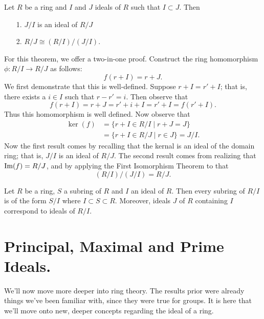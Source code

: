     \begin{thm}
        Let $R$ be a ring and $I$ and $J$ ideals of $R$ such
        that $I \subset J$. Then 
        \begin{itemize}
            \item[1.] $J/I$ is an ideal of $R/J$ 
            \item[2.] $R/J \cong (R/I)/(J/I)$. 
        \end{itemize}
    \end{thm}

    \begin{prf}
        For this theorem, we offer a two-in-one proof. 
        Construct the ring homomorphism $\phi:R/I \to R/J$ as
        follows: 
        \[
            f(r + I) = r + J.
        \]
        We first demonstrate that this is well-defined. Suppose $r
        + I = r' + I$; that is, there exists a $i \in I$ such that
        $r - r' = i$. Then observe that 
        \[
            f(r + I) = r + J = r' + i + I = r' + I = f(r' + I).
        \]
        Thus this homomorphism is well defined. Now observe that 
        \begin{align*}
            \ker(f) &= \{r + I \in R/I \mid r + J = J\}\\ 
            &= \{r + I \in R/J \mid r \in J\} = J/I.
        \end{align*}
        Now the first result comes by recalling that the kernal is
        an ideal of the domain ring; that is, $J/I$ is an ideal of
        $R/J$. The second result comes from realizing that $\mbox{Im}(f)
        = R/J$, and by applying the First Isomorphism Theorem to
        that 
        \[
            (R/I)/(J/I) = R/J.
        \]
    \end{prf}

    \begin{thm}
        Let $R$ be a ring, $S$ a subring of $R$ and $I$ an ideal of $R$. Then every
        subring of $R/I$ is of the form $S/I$ where $I \subset S
        \subset R$. Moreover, ideals $J$ of $R$ containing $I$
        correspond to ideals of $R/I$.
    \end{thm}

    \newpage
    \section{Principal, Maximal and Prime Ideals.}
    We'll now move more deeper into ring theory. The results
    prior were already things we've been familiar with, since they
    were true for groups. It is here that we'll move onto new,
    deeper concepts regarding the ideal of a ring. 

